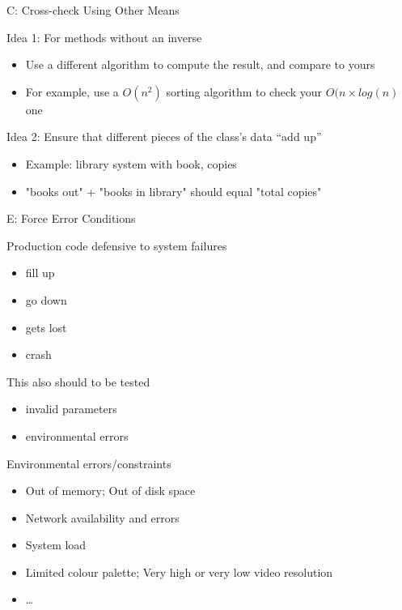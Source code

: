 \begin{frame}{C: Cross-check Using Other Means}
  \begin{block}{Idea 1: For methods without an inverse }
    \begin{itemize}
    \item Use a different algorithm to compute the result, and compare to yours
    \item For example, use a $O(n^2)$ sorting algorithm to check your
      $O(n\times log(n)$ one
    \end{itemize}
  \end{block}

  \begin{block}{Idea 2: Ensure that different pieces of the class's data ``add up''}
    \begin{itemize}
    \item Example: library system with book, copies
    \item "books out" + "books in library" should equal "total
      copies"
    \end{itemize}
  \end{block}
\end{frame}
\begin{frame}{E: Force Error Conditions}
  \begin{block}{Production code defensive to system failures}
    \begin{itemize}
    \item {} fill up
    \item {} go down
    \item {} gets lost
    \item {} crash
    \end{itemize}
  \end{block}
  \begin{block}{This also should to be tested}
    \begin{itemize}
    \item {} invalid parameters
    \item {} environmental errors
    \end{itemize}
  \end{block}
  \begin{block}{Environmental errors/constraints}
    \begin{itemize}
    \item Out of memory;  Out of disk space
    \item Network availability and errors
    \item System load
    \item Limited colour palette; Very high or very low video resolution
    \item \ldots
    \end{itemize}
  \end{block}
\end{frame}
